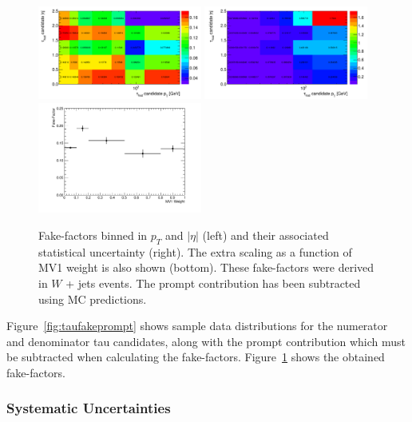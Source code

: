 \begin{figure}
\centering \includegraphics[width=0.48\textwidth]{figures/ch5-model-independent/TauFakes_FFPt}
\centering \includegraphics[width=0.48\textwidth]{figures/ch5-model-independent/TauFakes_FFEta}
\centering \includegraphics[width=0.48\textwidth]{figures/ch5-model-independent/TauFakes_FFMV1}
\caption{\label{fig:taufakefactors} Fake-factors binned in $p_{T}$ and $|\eta|$ (left) and
  their associated statistical uncertainty (right). The extra scaling as a function of MV1
  weight is also shown (bottom).  These fake-factors were derived in $W$ + jets
  events. The prompt contribution has been subtracted using MC predictions.}
\end{figure}

Figure~\ref{fig:taufakeprompt} shows sample data distributions for the numerator and
denominator tau candidates, along with the prompt contribution which must be subtracted
when calculating the fake-factors. Figure~\ref{fig:taufakefactors} shows the obtained
fake-factors.

\subsubsection{Systematic Uncertainties}\label{sec:model-independent-ff-tau-systematics}


